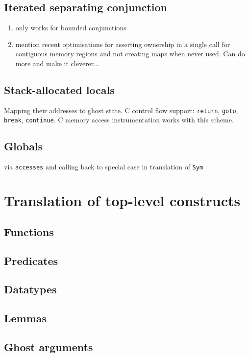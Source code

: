 \documentclass[withindex,glossary]{cam-thesis}
\begin{document}
\subsection{Iterated separating conjunction}

\begin{enumerate}
  \item only works for bounded conjunctions
  \item mention recent optimisations for asserting ownership in a single call for contiguous memory regions and not creating maps when never used. Can do more and make it cleverer...
\end{enumerate}


\subsection{Stack-allocated locals}

Mapping their addresses to ghost state. C control flow support: \texttt{return}, \texttt{goto}, \texttt{break}, \texttt{continue}. C memory access instrumentation works with this scheme.

\subsection{Globals}

via \texttt{accesses} and calling back to special case in translation of \texttt{Sym}

\section{Translation of top-level constructs}

\subsection{Functions}
\subsection{Predicates}
\subsection{Datatypes}
\subsection{Lemmas}
\subsection{Ghost arguments}
\end{document}
